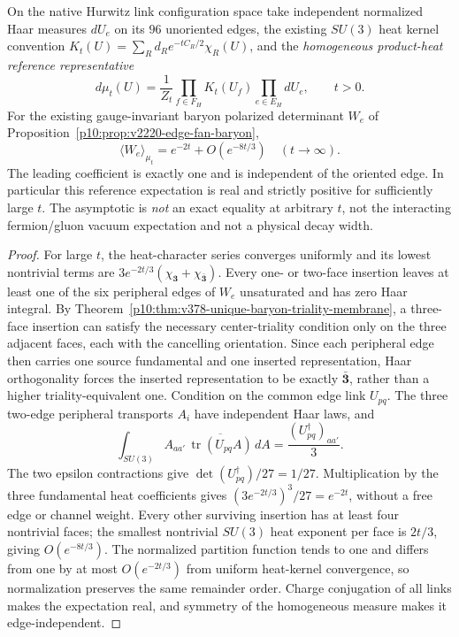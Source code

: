 \documentclass[12pt,a4paper]{article}
\begin{document}
\begin{theorem}
\label{p10:thm:v378-full-heat-baryon-leading}
On the native Hurwitz link configuration space take independent
normalized Haar measures $dU_e$ on its $96$ unoriented edges, the
existing $SU(3)$ heat kernel convention
$K_t(U)=\sum_R d_R e^{-tC_R/2}\chi_R(U)$,
and the \emph{homogeneous product-heat reference representative}
\[
 d\mu_t(U)=\frac{1}{Z_t}\prod_{f\in F_H}K_t(U_f)
                       \prod_{e\in E_H}dU_e,\qquad t>0.
\]
For the existing gauge-invariant baryon polarized determinant
$W_e$ of Proposition~\ref{p10:prop:v2220-edge-fan-baryon},
\[
\boxed{\langle W_e\rangle_{\mu_t}
=e^{-2t}+O(e^{-8t/3})\quad(t\longrightarrow\infty).}
\]
The leading coefficient is exactly one and is independent of the
oriented edge. In particular this reference expectation is real
and strictly positive for sufficiently large $t$.  The asymptotic
is \emph{not} an exact equality at arbitrary $t$, not the interacting
fermion/gluon vacuum expectation and not a physical decay width.
\end{theorem}
\begin{proof}
For large $t$, the heat-character series converges uniformly and
its lowest nontrivial terms are
$3e^{-2t/3}(\chi_{\mathbf3}+\chi_{\bar{\mathbf3}})$.
Every one- or two-face insertion leaves at least one of the six
peripheral edges of $W_e$ unsaturated and has zero Haar integral.
By Theorem~\ref{p10:thm:v378-unique-baryon-triality-membrane}, a
three-face insertion can satisfy the necessary center-triality
condition only on the three adjacent faces, each with the
cancelling orientation. Since each peripheral edge then carries one
source fundamental and one inserted representation, Haar
orthogonality forces the inserted representation to be exactly
$\bar{\mathbf3}$, rather than a higher triality-equivalent one.
Condition on the common edge link $U_{pq}$. The three two-edge
peripheral transports $A_i$ have independent Haar laws, and
\[
 \int_{SU(3)} A_{aa'}\,
   \overline{\operatorname{tr}(U_{pq}A)}\,dA
       =\frac{(U_{pq}^{\dagger})_{aa'}}{3}.
\]
The two epsilon contractions give
$\det(U_{pq}^{\dagger})/27=1/27$. Multiplication by the three
fundamental heat coefficients gives
$(3e^{-2t/3})^3/27=e^{-2t}$, without a free edge or
channel weight. Every other surviving insertion has at least four
nontrivial faces; the smallest nontrivial $SU(3)$ heat exponent per
face is $2t/3$, giving $O(e^{-8t/3})$. The normalized partition
function tends to one and differs from one by at most
$O(e^{-2t/3})$ from uniform heat-kernel convergence, so
normalization preserves the same remainder order. Charge
conjugation of all links makes the expectation real, and symmetry
of the homogeneous measure makes it edge-independent.
\end{proof}
\end{document}
